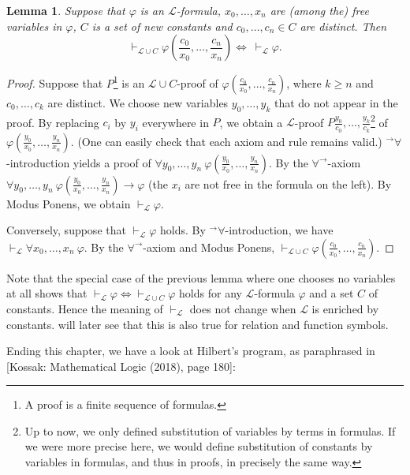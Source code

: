 \documentclass[a4paper, 11pt]{amsart}
\newtheorem{lemma}[lemma]{Lemma}
\theoremstyle{remark}
\newcommand{\cL}{\mathcal L}
\begin{document}
\begin{lemma} 
\label{new constants behave like free variables} 
Suppose that $\varphi$ is an $\cL$-formula, $x_0,\dots,x_n$ are (among the) free variables in $\varphi$, $C$ is a set of new constants and $c_0,\dots,c_n\in C$ are distinct. Then 
$$ \vdash_{\cL \cup C} \varphi(\frac{c_0}{x_0},\dots,\frac{c_n}{x_n})  \Longleftrightarrow \   \vdash_\cL \varphi .$$ 
\end{lemma} 
\begin{proof} 
Suppose that $P$\footnote{A proof is a finite sequence of formulas.} is an $\cL\cup C$-proof of $\varphi(\frac{c_0}{x_0},\dots,\frac{c_n}{x_n})$, where $k\geq n$ and $c_0,\dots,c_k$ are distinct. 
We choose new variables $y_0,\dots, y_k$ that do not appear in the proof. 
By replacing $c_i$ by $y_i$ everywhere in $P$, we obtain a $\cL$-proof $P \frac{y_0}{c_0},\dots,\frac{y_k}{c_k}$\footnote{Up to now, we only defined substitution of variables by terms in formulas. 
If we were more precise here, we would define substitution of constants by variables in formulas, and thus in proofs, in precisely the same way.} of $\varphi(\frac{y_0}{x_0},\dots,\frac{y_n}{x_n})$. 
(One can easily check that each axiom and rule remains valid.) 
${}^\rightarrow\forall$-introduction yields a proof of 
$\forall y_0,\dots, y_n\ \varphi(\frac{y_0}{x_0},\dots,\frac{y_n}{x_n})$. 
By the $\forall^\rightarrow$-axiom $\forall y_0,\dots, y_n\ \varphi(\frac{y_0}{x_0},\dots,\frac{y_n}{x_n}) \rightarrow \varphi$ (the $x_i$ are not free in the formula on the left). 
By Modus Ponens, we obtain $\vdash_\cL \varphi$. 

Conversely, suppose that $\vdash_\cL \varphi$ holds. 
By ${}^\rightarrow\forall$-introduction, we have $\vdash_\cL \forall x_0,\dots,x_n\ \varphi$. 
By the $\forall^\rightarrow$-axiom and Modus Ponens, $\vdash_{\cL \cup C} \varphi(\frac{c_0}{x_0},\dots,\frac{c_n}{x_n})$. 
\end{proof} 

Note that  the special case of the previous lemma where one chooses no variables at all shows that $\vdash_\cL \varphi  \Longleftrightarrow \vdash_{\cL\cup C} \varphi$ holds for any $\cL$-formula $\varphi$ and a set $C$ of constants. 
Hence the meaning of $\vdash_\cL$ does not change when $\cL$ is enriched by constants. 
 will later see that this is also true for relation and function symbols. 
 
 
 

Ending this chapter, we have a look at Hilbert's program, as paraphrased in [Kossak: Mathematical Logic (2018), page 180]: 
\end{document}
